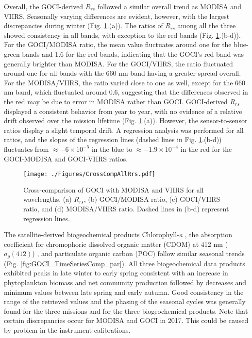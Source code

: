 \documentclass[10pt]{article}
\begin{document}
Overall, the GOCI-derived $R_{rs}$ followed a similar overall trend as MODISA and VIIRS.  Seasonally varying differences are evident, however, with the largest discrepancies during winter (Fig. \ref{fig:CrossCompAllRrs}.(a)). The ratios of $R_{rs}$ among all the three showed consistency in all bands, with exception to the red bands (Fig. \ref{fig:CrossCompAllRrs}.(b-d)). For the GOCI/MODISA ratio, the mean value fluctuates around one for the blue-green bands and $1.6$ for the red bands, indicating that the GOCI's red band was generally brighter than MODISA. For the GOCI/VIIRS, the ratio fluctuated around one for all bands with the 660 nm band having a greater spread overall. For the MODISA/VIIRS, the ratio varied close to one as well, except for the 660 nm band, which fluctuated around 0.6, suggesting that the differences observed in the red may be due to error in MODISA rather than GOCI. GOCI-derived $R_{rs}$ displayed a consistent behavior from year to year, with no evidence of a relative drift observed over the mission lifetime (Fig. \ref{fig:CrossCompAllRrs}.(a)). However, the sensor-to-sensor ratios display a slight temporal drift. A regression analysis was performed for all ratios, and the slopes of the regression lines (dashed lines in Fig. \ref{fig:CrossCompAllRrs}.(b-d)) fluctuates from $\approx-6\times10^{-5}$ in the blue to $\approx-1.9\times10^{-4}$ in the red for the GOCI-MODISA and GOCI-VIIRS ratios.
\begin{figure}[H]
  \centering
  \texttt{[image: ./Figures/CrossCompAllRrs.pdf]}
    \caption{Cross-comparison of GOCI with MODISA and VIIRS for all wavelengths. (a) $R_{rs}$, (b) GOCI/MODISA ratio, (c) GOCI/VIIRS ratio, and (d) MODISA/VIIRS ratio. Dashed lines in (b-d) represent regression lines. \label{fig:CrossCompAllRrs} } 
\end{figure}
The satellite-derived biogeochemical products Chlorophyll-{\it a} \cite{OReilly1998_Chl}, the absorption coefficient for chromophoric dissolved organic matter (CDOM) at 412 nm  ($a_g(412)$) \cite{Mannino2014}, and particulate organic carbon (POC) \cite{Stramski2008} follow similar seasonal trends (Fig. \ref{fig:GOCI_TimeSeriesComp_par}). All three biogeochemical data products exhibited peaks in late winter to early spring consistent with an increase in phytoplankton biomass and net community production followed by decreases and minimum values between late spring and early autumn. Good consistency in the range of the retrieved values and the phasing of the seasonal cycles was generally found for the three missions and for the three biogeochemical products. Note that certain discrepancies occur for MODISA and GOCI in 2017. This could be caused by problem in the instrument calibrations.
\end{document}
